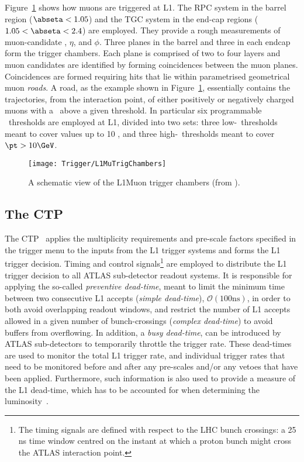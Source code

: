 			Figure~\ref{fig:L1MuTrig} shows how muons are triggered at \ac{L1}. The \ac{RPC} system in the barrel region ($\abseta < 1.05$) and the \ac{TGC} system in the end-cap regions ($1.05 < \abseta < 2.4$) are employed. They provide a rough measurements of muon-candidate \pt, $\eta$, and $\phi$. Three planes in the barrel and three in each endcap form the trigger chambers. Each plane is comprised of two to four layers and muon candidates are identified by forming coincidences between the muon planes. Coincidences are formed requiring hits that lie within parametrised geometrical muon \emph{roads}. A road, as the example shown in Figure~\ref{fig:L1MuTrig}, essentially contains the trajectories, from the interaction point, of either positively or negatively charged muons with a \pt\ above a given threshold. In particular six programmable \pt\ thresholds are employed at \ac{L1}, divided into two sets: three low-\pt\ thresholds meant to cover values up to 10 \GeV, and three high-\pt\ thresholds meant to cover $\pt > 10 \GeV$.

			\begin{figure}[!htb]
				\centering
				\texttt{[image: Trigger/L1MuTrigChambers]}
				\caption{\label{fig:L1MuTrig} A schematic view of the \ac{L1Muon} trigger chambers (from \cite{ATLASTrigger2010}).}
			\end{figure}


		\subsection*{The CTP}

			The \ac{CTP}~\cite{ATLASJINST} applies the multiplicity requirements and pre-scale factors specified in the trigger menu to the inputs from the \ac{L1} trigger systems and forms the \ac{L1} trigger decision. Timing and control signals\footnote{The timing signals are defined with respect to the \ac{LHC} bunch crossings: a 25 ns time window centred on the instant at which a proton bunch might cross the \ac{ATLAS} interaction point.} are employed to distribute the \ac{L1} trigger decision to all \ac{ATLAS} sub-detector readout systems. It is responsible for applying the so-called \emph{preventive dead-time}, meant to limit the minimum time between two consecutive \ac{L1} accepts (\emph{simple dead-time}), $\mathcal{O}(100 \mathrm{ns})$, in order to both avoid overlapping readout windows, and restrict the number of \ac{L1} accepts allowed in a given number of bunch-crossings (\emph{complex dead-time}) to avoid buffers from overflowing. In addition, a \emph{busy dead-time}, can be introduced by \ac{ATLAS} sub-detectors to temporarily throttle the trigger rate. These dead-times are used to monitor the total \ac{L1} trigger rate, and individual trigger rates that need to be monitored before and after any pre-scales and/or any vetoes that have been applied. Furthermore, such information is also used to provide a measure of the \ac{L1} dead-time, which has to be accounted for when determining the luminosity~\cite{ATLASTrigger2010}.

